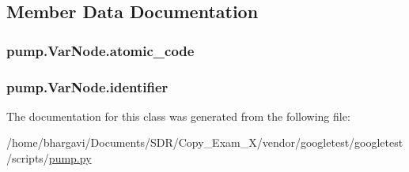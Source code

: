 \subsection{Member Data Documentation}
\subsubsection[{\texorpdfstring{atomic\+\_\+code}{atomic_code}}]{\setlength{\rightskip}{0pt plus 5cm}pump.\+Var\+Node.\+atomic\+\_\+code}\hypertarget{classpump_1_1_var_node_ad6bef6a8577b994fbe9ccddf3c82d2fc}{}\label{classpump_1_1_var_node_ad6bef6a8577b994fbe9ccddf3c82d2fc}
\subsubsection[{\texorpdfstring{identifier}{identifier}}]{\setlength{\rightskip}{0pt plus 5cm}pump.\+Var\+Node.\+identifier}\hypertarget{classpump_1_1_var_node_aa2b634e2443646c3754f2d193efa4dc7}{}\label{classpump_1_1_var_node_aa2b634e2443646c3754f2d193efa4dc7}


The documentation for this class was generated from the following file\+:\begin{DoxyCompactItemize}
\item 
/home/bhargavi/\+Documents/\+S\+D\+R/\+Copy\+\_\+\+Exam\+\_\+X/vendor/googletest/googletest/scripts/\hyperlink{pump_8py}{pump.\+py}\end{DoxyCompactItemize}
